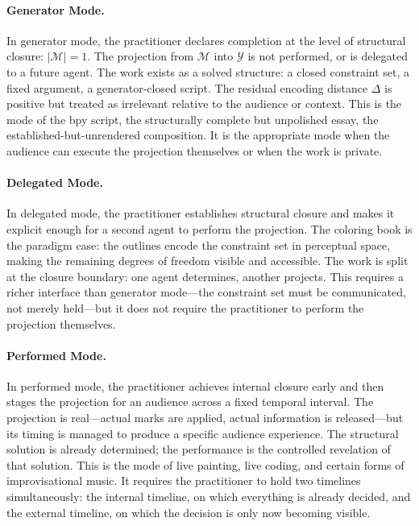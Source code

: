 \documentclass[12pt, twoside]{article}
\theoremstyle{plain}
\theoremstyle{definition}
\theoremstyle{remark}
\begin{document}
\paragraph{Generator Mode.}
In generator mode, the practitioner declares completion at the level of structural closure: $|\mathcal{M}| = 1$. The projection from $\mathcal{M}$ into $\mathcal{Y}$ is not performed, or is delegated to a future agent. The work exists as a solved structure: a closed constraint set, a fixed argument, a generator-closed script. The residual encoding distance $\Delta$ is positive but treated as irrelevant relative to the audience or context. This is the mode of the bpy script, the structurally complete but unpolished essay, the established-but-unrendered composition. It is the appropriate mode when the audience can execute the projection themselves or when the work is private.

\paragraph{Delegated Mode.}
In delegated mode, the practitioner establishes structural closure and makes it explicit enough for a second agent to perform the projection. The coloring book is the paradigm case: the outlines encode the constraint set in perceptual space, making the remaining degrees of freedom visible and accessible. The work is split at the closure boundary: one agent determines, another projects. This requires a richer interface than generator mode---the constraint set must be communicated, not merely held---but it does not require the practitioner to perform the projection themselves.

\paragraph{Performed Mode.}
In performed mode, the practitioner achieves internal closure early and then stages the projection for an audience across a fixed temporal interval. The projection is real---actual marks are applied, actual information is released---but its timing is managed to produce a specific audience experience. The structural solution is already determined; the performance is the controlled revelation of that solution. This is the mode of live painting, live coding, and certain forms of improvisational music. It requires the practitioner to hold two timelines simultaneously: the internal timeline, on which everything is already decided, and the external timeline, on which the decision is only now becoming visible.
\end{document}
